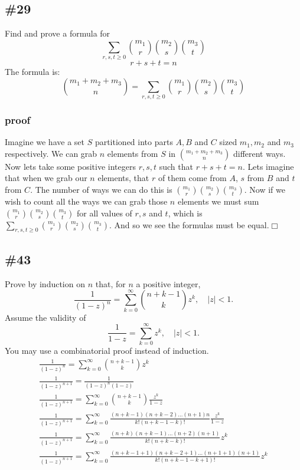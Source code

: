 \documentclass{article}
\newcommand{\abs}[1]{\left\lvert #1 \right\rvert}
\begin{document}
\subsection*{\#29}
Find and prove a formula for
\[\sum\limits_{r,s,t\ge 0}{\binom{m_1}{r}\binom{m_2}{s}\binom{m_3}{t}}\]
\[r+s+t=n\]
The formula is:
\[\binom{m_1+m_2+m_3}{n}=\sum\limits_{r,s,t\ge 0}{\binom{m_1}{r}\binom{m_2}{s}\binom{m_3}{t}}\]
\subsubsection*{proof}
Imagine we have a set $S$ partitioned into parts $A,B$ and $C$ sized $m_1,m_2$ and $m_3$ respectively. We can grab $n$ elements from $S$ in $\binom{m_1+m_2+m_3}{n}$ different ways. Now lets take some positive integers $r,s,t$ such that $r+s+t=n$. Lets imagine that when we grab our $n$ elements, that $r$ of them come from $A$, $s$ from $B$ and $t$ from $C$. The number of ways we can do this is $\binom{m_1}{r}\binom{m_2}{s}\binom{m_3}{t}$. Now if we wish to count all the ways we can grab those $n$ elements we must sum $\binom{m_1}{r}\binom{m_2}{s}\binom{m_3}{t}$ for all values of $r,s$ and $t$, which is $\sum\limits_{r,s,t\ge 0}{\binom{m_1}{r}\binom{m_2}{s}\binom{m_3}{t}}$. And so we see the formulas must be equal.$\Box$
\subsection*{\#43}
Prove by induction on $n$ that, for $n$ a positive integer,
\[\frac{1}{(1-z)^n}=\sum\limits_{k=0}^\infty{\binom{n+k-1}{k}z^k},\quad\abs{z}<1.\]
Assume the validity of
\[\frac{1}{1-z}=\sum\limits_{k=0}^\infty{z^k},\quad\abs{z}<1.\]
You may use a combinatorial proof instead of induction.
\begin{align*}
  \frac{1}{(1-z)^n}=\sum\limits_{k=0}^\infty{\binom{n+k-1}{k}z^k}\\
  \frac{1}{(1-z)^{n+1}}=\frac{1}{(1-z)^n(1-z)}\\
  \frac{1}{(1-z)^{n+1}}=\sum\limits_{k=0}^\infty{\binom{n+k-1}{k}\frac{z^k}{1-z}}\\
  \frac{1}{(1-z)^{n+1}}=\sum\limits_{k=0}^\infty{\frac{(n+k-1)(n+k-2)\dots(n+1)n}{k!(n+k-1-k)!}\frac{z^k}{1-z}}\\
  \frac{1}{(1-z)^{n+1}}=\sum\limits_{k=0}^\infty{\frac{(n+k)(n+k-1)\dots(n+2)(n+1)}{k!(n+k-k)!}z^k}\\
  \frac{1}{(1-z)^{n+1}}=\sum\limits_{k=0}^\infty{\frac{(n+k-1+1)(n+k-2+1)\dots(n+1+1)(n+1)}{k!(n+k-1-k+1)!}z^k}\\
\end{align*}
\end{document}
